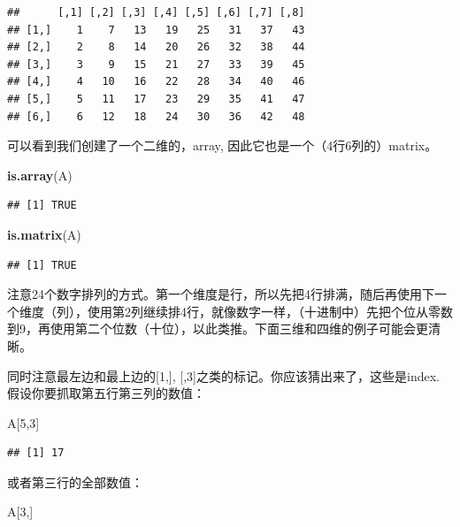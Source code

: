 \documentclass[]{book}
\newenvironment{Shaded}{\begin{snugshade}}{\end{snugshade}}
\newcommand{\DecValTok}[1]{\textcolor[rgb]{0.00,0.00,0.81}{#1}}
\newcommand{\KeywordTok}[1]{\textcolor[rgb]{0.13,0.29,0.53}{\textbf{#1}}}
\newcommand{\NormalTok}[1]{#1}
\begin{document}
\begin{verbatim}
##      [,1] [,2] [,3] [,4] [,5] [,6] [,7] [,8]
## [1,]    1    7   13   19   25   31   37   43
## [2,]    2    8   14   20   26   32   38   44
## [3,]    3    9   15   21   27   33   39   45
## [4,]    4   10   16   22   28   34   40   46
## [5,]    5   11   17   23   29   35   41   47
## [6,]    6   12   18   24   30   36   42   48
\end{verbatim}

可以看到我们创建了一个二维的，array, 因此它也是一个（4行6列的）matrix。

\begin{Shaded}
\begin{Highlighting}[]
\KeywordTok{is.array}\NormalTok{(A)}
\end{Highlighting}
\end{Shaded}

\begin{verbatim}
## [1] TRUE
\end{verbatim}

\begin{Shaded}
\begin{Highlighting}[]
\KeywordTok{is.matrix}\NormalTok{(A)}
\end{Highlighting}
\end{Shaded}

\begin{verbatim}
## [1] TRUE
\end{verbatim}

注意24个数字排列的方式。第一个维度是行，所以先把4行排满，随后再使用下一个维度（列），使用第2列继续排4行，就像数字一样，（十进制中）先把个位从零数到9，再使用第二个位数（十位），以此类推。下面三维和四维的例子可能会更清晰。

同时注意最左边和最上边的{[}1,{]}, {[},3{]}之类的标记。你应该猜出来了，这些是index. 假设你要抓取第五行第三列的数值：

\begin{Shaded}
\begin{Highlighting}[]
\NormalTok{A[}\DecValTok{5}\NormalTok{,}\DecValTok{3}\NormalTok{]}
\end{Highlighting}
\end{Shaded}

\begin{verbatim}
## [1] 17
\end{verbatim}

或者第三行的全部数值：

\begin{Shaded}
\begin{Highlighting}[]
\NormalTok{A[}\DecValTok{3}\NormalTok{,]}
\end{Highlighting}
\end{Shaded}
\end{document}
